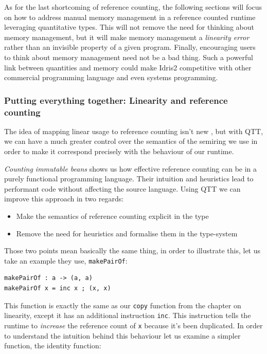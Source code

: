 \documentclass[
]{article}
\providecommand{\tightlist}{%
  \setlength{\itemsep}{0pt}\setlength{\parskip}{0pt}}
\begin{document}
As for the last shortcoming of reference counting, the following
sections will focus on how to address manual memory management in a
reference counted runtime leveraging quantitative types. This will not
remove the need for thinking about memory management, but it will make
memory management a \emph{linearity error} rather than an invisible
property of a given program. Finally, encouraging users to think about
memory management need not be a bad thing. Such a powerful link between
quantities and memory could make Idris2 competitive with other
commercial programming language and even systems programming.

\hypertarget{putting-everything-together-linearity-and-reference-counting}{%
\subsubsection{Putting everything together: Linearity and reference
counting}\label{putting-everything-together-linearity-and-reference-counting}}

The idea of mapping linear usage to reference counting isn't new
\cite{linear_ref_count}, but with QTT, we can have a much greater
control over the semantics of the semiring we use in order to make it
correspond precisely with the behaviour of our runtime.

\emph{Counting immutable beans}\cite{} shows us how effective reference
counting can be in a purely functional programming language. Their
intuition and heuristics lead to performant code without affecting the
source language. Using QTT we can improve this approach in two regards:

\begin{itemize}
\tightlist
\item
  Make the semantics of reference counting explicit in the type
\item
  Remove the need for heuristics and formalise them in the type-system
\end{itemize}

Those two points mean basically the same thing, in order to illustrate
this, let us take an example they use, \texttt{makePairOf}:

\begin{verbatim}
makePairOf : a -> (a, a)
makePairOf x = inc x ; (x, x)
\end{verbatim}

This function is exactly the same as our \texttt{copy} function from the
chapter on linearity, except it has an additional instruction
\texttt{inc}. This instruction tells the runtime to \emph{increase} the
reference count of \texttt{x} because it's been duplicated. In order to
understand the intuition behind this behaviour let us examine a simpler
function, the identity function:
\end{document}
